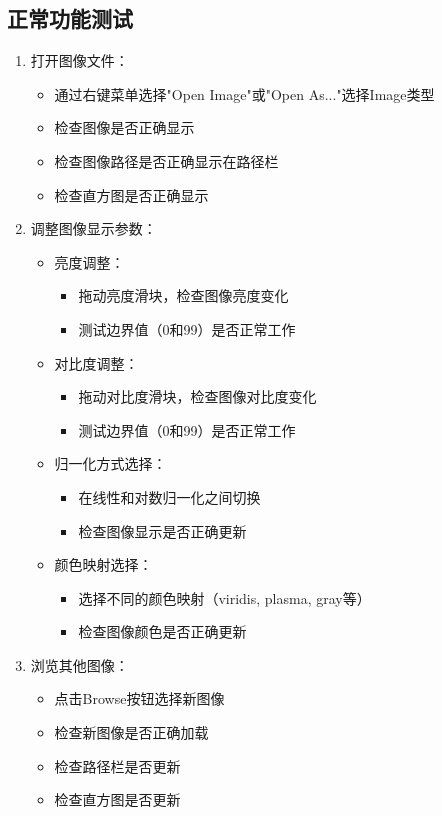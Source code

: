 \documentclass[a4paper,12pt]{report}	%
\begin{document}
\subsection{正常功能测试}
\begin{enumerate}
    \item 打开图像文件：
    \begin{itemize}
        \item 通过右键菜单选择"Open Image"或"Open As..."选择Image类型
        \item 检查图像是否正确显示
        \item 检查图像路径是否正确显示在路径栏
        \item 检查直方图是否正确显示
    \end{itemize}

    \item 调整图像显示参数：
    \begin{itemize}
        \item 亮度调整：
        \begin{itemize}
            \item 拖动亮度滑块，检查图像亮度变化
            \item 测试边界值（0和99）是否正常工作
        \end{itemize}
        \item 对比度调整：
        \begin{itemize}
            \item 拖动对比度滑块，检查图像对比度变化
            \item 测试边界值（0和99）是否正常工作
        \end{itemize}
        \item 归一化方式选择：
        \begin{itemize}
            \item 在线性和对数归一化之间切换
            \item 检查图像显示是否正确更新
        \end{itemize}
        \item 颜色映射选择：
        \begin{itemize}
            \item 选择不同的颜色映射（viridis, plasma, gray等）
            \item 检查图像颜色是否正确更新
        \end{itemize}
    \end{itemize}

    \item 浏览其他图像：
    \begin{itemize}
        \item 点击Browse按钮选择新图像
        \item 检查新图像是否正确加载
        \item 检查路径栏是否更新
        \item 检查直方图是否更新
    \end{itemize}
\end{enumerate}
\end{document}
